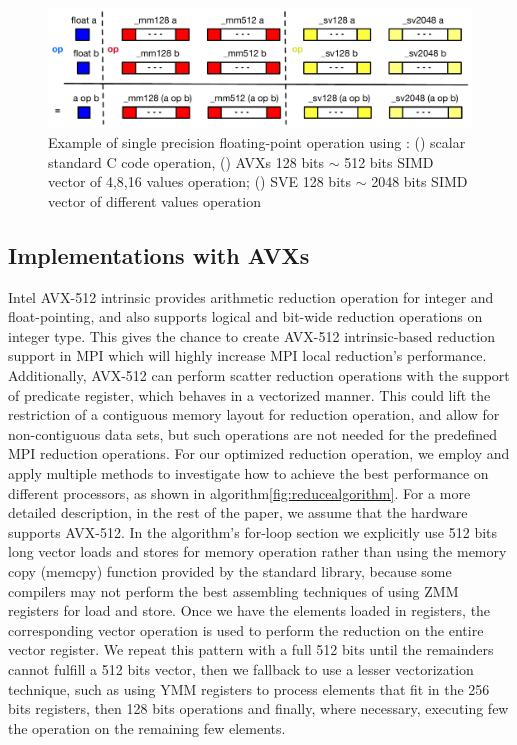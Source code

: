 \documentclass[5p,times,twocolumn]{elsarticle}
\newcommand{\mpi}[0]{\textsc{MPI}\xspace}
\begin{document}
\begin{figure}[h]
    \centering
    \includegraphics[width=\linewidth]{sse_avx_avx512_sve.pdf}
    \caption{Example of single precision floating-point operation using : (\colorbox{blue}{})
    scalar standard C code operation,
    (\colorbox{red}{}) AVXs 128 bits $\sim$ 512 bits SIMD vector of 4,8,16 values operation;
    (\colorbox{yellow}{}) SVE 128 bits $\sim$ 2048 bits SIMD vector of different values operation}
    \label{fig:sseavx}
\end{figure}

\subsection{Implementations with AVXs}
Intel AVX-512 intrinsic provides arithmetic reduction operation for integer and
float-pointing, and also supports logical and bit-wide reduction operations on integer type.
This gives the chance to create AVX-512 intrinsic-based reduction support in \mpi which
will highly increase \mpi local reduction's performance.
Additionally, AVX-512 can perform scatter reduction operations with the
support of predicate register, which behaves in a vectorized manner. This
could lift the restriction of a contiguous memory layout for reduction operation, and allow for non-contiguous
data sets, but such operations
are not needed for the predefined MPI reduction operations.
%
For our optimized reduction operation, we employ and apply multiple
methods to investigate how to achieve the
best performance on different processors, as shown in algorithm\ref{fig:reducealgorithm}.
For a more detailed description, in the rest of the paper, we assume that the hardware supports AVX-512.
In the algorithm's for-loop section we explicitly use 512 bits long vector loads and stores for memory operation rather than using the memory copy (memcpy) function provided by
the standard library, because some compilers may not perform
the best assembling techniques of using ZMM registers for load and store.
%
Once we have the elements loaded in registers, the corresponding vector operation is used
to perform the reduction on the entire vector register.
We repeat this pattern with a full 512 bits until the remainders cannot fulfill a 512 bits vector,
then we fallback to use a lesser vectorization technique, such as using YMM registers to process elements that fit in the 256 bits registers, then 128 bits operations and finally, where necessary, executing few the operation on the remaining few elements.
\end{document}
